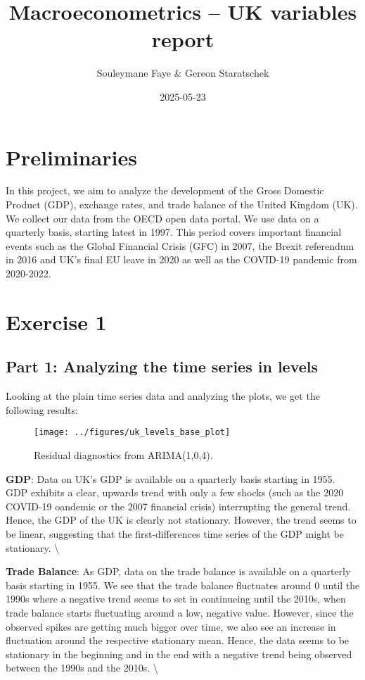 \documentclass[
]{article}
\title{Macroeconometrics -- UK variables report}
\author{Souleymane Faye \& Gereon Staratschek}
\date{2025-05-23}
\begin{document}
\maketitle

\section*{Preliminaries}

In this project, we aim to analyze the development of the Gross Domestic
Product (GDP), exchange rates, and trade balance of the United Kingdom
(UK). We collect our data from the OECD open data portal. We use data on
a quarterly basis, starting latest in 1997. This period covers important
financial events such as the Global Financial Crisis (GFC) in 2007, the
Brexit referendum in 2016 and UK's final EU leave in 2020 as well as the
COVID-19 pandemic from 2020-2022.

\section*{Exercise 1}

\subsection*{Part 1: Analyzing the time series in levels}

Looking at the plain time series data and analyzing the plots, we get
the following results:

\begin{figure}

{\centering \texttt{[image: ../figures/uk\_levels\_base\_plot]} 

}

\caption{Residual diagnostics from ARIMA(1,0,4).}\label{fig:resid-plot}
\end{figure}

\textbf{GDP}: Data on UK's GDP is available on a quarterly basis
starting in 1955. GDP exhibits a clear, upwards trend with only a few
shocks (such as the 2020 COVID-19 oandemic or the 2007 financial crisis)
interrupting the general trend. Hence, the GDP of the UK is clearly not
stationary. However, the trend seems to be linear, suggesting that the
first-differences time series of the GDP might be stationary.
\textbackslash{}

\textbf{Trade Balance}: As GDP, data on the trade balance is available
on a quarterly basis starting in 1955. We see that the trade balance
fluctuates around 0 until the 1990s where a negative trend seems to set
in continueing until the 2010s, when trade balance starts fluctuating
around a low, negative value. However, since the observed spikes are
getting much bigger over time, we also see an increase in fluctuation
around the respective stationary mean. Hence, the data seems to be
stationary in the beginning and in the end with a negative trend being
observed between the 1990s and the 2010s. \textbackslash{}
\end{document}
